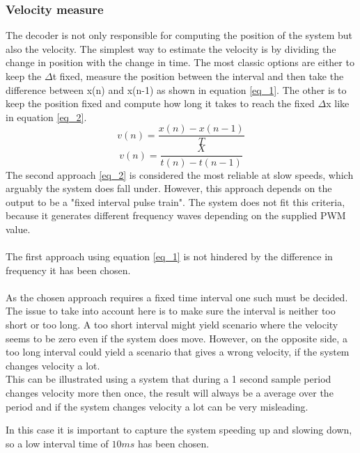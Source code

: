 \documentclass[../../../main]{subfiles}
\begin{document}
\subsubsection{Velocity measure}
The decoder is not only responsible for computing the position of the system but also the velocity. The simplest way to estimate the velocity is by dividing the change in position with the change in time. The most classic options are either to keep the $\Delta$t fixed, measure the position between the interval and then take the difference between x(n) and x(n-1) as shown in equation \ref{eq_1}. The other is to keep the position fixed and compute how long it takes to reach the fixed  $\Delta$x like in equation \ref{eq_2}.
\begin{equation}
v(n) = \frac{x(n)-x(n-1)}{T}
\label{eq_1}
\end{equation}
\begin{equation}
  v(n) = \frac{X}{t(n)-t(n-1)}
  \label{eq_2}
\end{equation}
The second approach \ref{eq_2} is considered the most reliable at slow speeds, which arguably the system does fall under. However, this approach depends on the output to be a "fixed interval pulse train"\cite{Velocity_encoder}. The system does not fit this criteria, because it generates different frequency waves depending on the supplied PWM value.\\
\\
The first approach using equation \ref{eq_1} is not hindered by the difference in frequency it has been chosen.  \\
\\
 As the chosen approach requires a fixed time interval one such must be decided.  The issue to take into account here is to make sure the interval is neither too short or too long.
 A too short interval might yield scenario where the velocity seems to be zero even if the system does move. However, on the opposite side, a too long interval could yield a scenario that gives a wrong velocity, if the system changes velocity a lot.
\\
This can be illustrated using a system that during a 1 second sample period changes velocity more then once, the result will always be a average over the period and if the system changes velocity a lot can be very misleading.

In this case it is important to capture the system speeding up and slowing down, so a low interval time of $10ms$ has been chosen.
\end{document}
